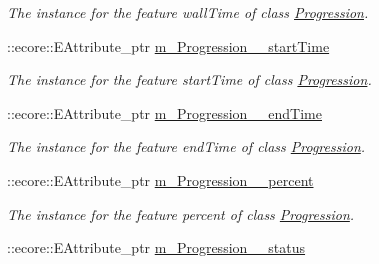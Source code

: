 \begin{DoxyCompactItemize}
\begin{DoxyCompactList}\small\item\em The instance for the feature wallTime of class \hyperlink{classTMS__Data_1_1Progression}{Progression}. \item\end{DoxyCompactList}\item 
\hypertarget{classTMS__Data_1_1TMS__DataPackage_a5579b2d0afc303f2bc9fe72a80682ce9}{
::ecore::EAttribute\_\-ptr \hyperlink{classTMS__Data_1_1TMS__DataPackage_a5579b2d0afc303f2bc9fe72a80682ce9}{m\_\-Progression\_\-\_\-startTime}}
\label{classTMS__Data_1_1TMS__DataPackage_a5579b2d0afc303f2bc9fe72a80682ce9}

\begin{DoxyCompactList}\small\item\em The instance for the feature startTime of class \hyperlink{classTMS__Data_1_1Progression}{Progression}. \item\end{DoxyCompactList}\item 
\hypertarget{classTMS__Data_1_1TMS__DataPackage_ae26c169e6b913d78e77dcb334f01df91}{
::ecore::EAttribute\_\-ptr \hyperlink{classTMS__Data_1_1TMS__DataPackage_ae26c169e6b913d78e77dcb334f01df91}{m\_\-Progression\_\-\_\-endTime}}
\label{classTMS__Data_1_1TMS__DataPackage_ae26c169e6b913d78e77dcb334f01df91}

\begin{DoxyCompactList}\small\item\em The instance for the feature endTime of class \hyperlink{classTMS__Data_1_1Progression}{Progression}. \item\end{DoxyCompactList}\item 
\hypertarget{classTMS__Data_1_1TMS__DataPackage_a7b1a2c006664a291c749d77539c2c6c1}{
::ecore::EAttribute\_\-ptr \hyperlink{classTMS__Data_1_1TMS__DataPackage_a7b1a2c006664a291c749d77539c2c6c1}{m\_\-Progression\_\-\_\-percent}}
\label{classTMS__Data_1_1TMS__DataPackage_a7b1a2c006664a291c749d77539c2c6c1}

\begin{DoxyCompactList}\small\item\em The instance for the feature percent of class \hyperlink{classTMS__Data_1_1Progression}{Progression}. \item\end{DoxyCompactList}\item 
\hypertarget{classTMS__Data_1_1TMS__DataPackage_aea29aede75820dd6f9de0ee501f6bb03}{
::ecore::EAttribute\_\-ptr \hyperlink{classTMS__Data_1_1TMS__DataPackage_aea29aede75820dd6f9de0ee501f6bb03}{m\_\-Progression\_\-\_\-status}}
\label{classTMS__Data_1_1TMS__DataPackage_aea29aede75820dd6f9de0ee501f6bb03}


\end{DoxyCompactItemize}
